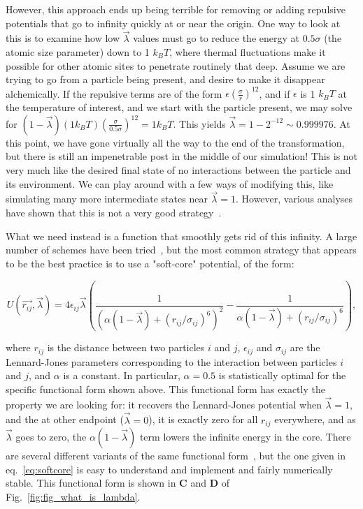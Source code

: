 \documentclass[9pt,bestpractices,pubversion]{livecoms}
\begin{document}
However, this approach ends up being terrible for removing or adding repulsive potentials that go to infinity quickly at or near the origin. One way to look at this is to examine how low $\vec{\lambda}$ values must go to reduce the energy at $0.5\sigma$ (the atomic size parameter) down to 1 $k_BT$, where thermal fluctuations make it possible for other atomic sites to penetrate routinely that deep. Assume we are trying to go from a particle being present, and desire to make it disappear alchemically. If the repulsive terms are of the form $\epsilon(\frac{\sigma}{r})^{12}$, and if $\epsilon$ is 1 $k_BT$ at the temperature of interest, and we start with the particle present, we may solve for $(1-\vec{\lambda})(1 k_B T)\left(\frac{\sigma}{0.5\sigma}\right)^{12} = 1 k_B T$. This yields $\vec{\lambda} = 1-2^{-12} \sim 0.999976$. At this point,  we have gone virtually all the way to the end of the transformation, but there is still an impenetrable post in the middle of our simulation! This is not very much like the desired final state of no interactions between the particle and its environment. We can play around with a few ways of modifying this, like simulating many more intermediate states near $\vec{\lambda}=1$. However, various analyses have shown that this is not a very good strategy~\cite{pham2011identifying, beutler1994avoiding, zacharias1994separationshifted, blondel2004ensemble, gapsys2012new}.

What we need instead is a function that smoothly gets rid of this infinity. A large number of schemes have been tried~\cite{beutler1994avoiding, zacharias1994separationshifted, blondel2004ensemble, pham2011identifying, pham2012optimal, naden2014linear, donnini2005incorporating}, but the most common strategy that appears to be the best practice is to use a "soft-core" potential, of the form:

\begin{equation}
    U(\vec{r_{ij}},\vec{\lambda}) = 4\epsilon_{ij} \vec{\lambda} \left(\frac{1}{(\alpha(1-\vec{\lambda}) + (r_{ij}/\sigma_{ij})^6)^2} -  \frac{1}{\alpha(1-\vec{\lambda}) + (r_{ij}/\sigma_{ij})^6}\right)
    \label{eq:softcore},
\end{equation}

where $r_{ij}$ is the distance between two particles $i$ and $j$, $\epsilon_{ij}$ and $\sigma_{ij}$ are the Lennard-Jones parameters corresponding to the interaction between particles $i$ and $j$, and $\alpha$ is a constant. In particular, $\alpha=0.5$ is statistically optimal for the specific functional form shown above. This functional form has exactly the property we are looking for: it recovers the Lennard-Jones potential when $\vec{\lambda}=1$, and the at other endpoint ($\vec{\lambda}=0$), it is exactly zero for all $r_{ij}$ everywhere, and as $\vec{\lambda}$ goes to zero, the $\alpha(1-\vec{\lambda})$ term lowers the infinite energy in the core. There are several different variants of the same functional form~\cite{zacharias1994separationshifted, beutler1994avoiding,pham2011identifying}, but the one given in eq.~\ref{eq:softcore} is easy to understand and implement and fairly numerically stable. This functional form is shown in \textbf{C} and \textbf{D} of Fig.~\ref{fig:fig_what_is_lambda}.
\end{document}
